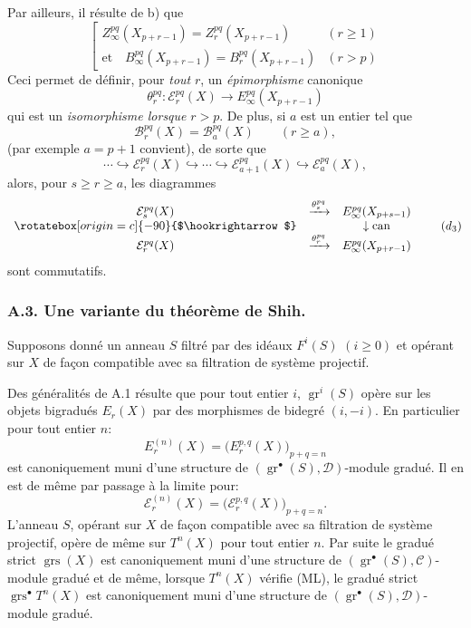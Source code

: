 \documentclass[11pt]{article}
\providecommand{\gr}{\operatorname{gr}}
\providecommand{\gr}{\operatorname{gr}}
\providecommand{\gr}{\operatorname{gr}}
\providecommand{\grs}{\operatorname{grs}}
\providecommand{\can}{\operatorname{can}}
\begin{document}
Par ailleurs, il résulte de b) que
\begin{equation}
\left[
\begin{array}{ll}
Z_\infty^{pq}(X_{p+r-1})=Z_r^{pq}(X_{p+r-1})&(r\ge1)\\[3pt]
\text{et}\quad B_\infty^{pq}(X_{p+r-1})=B_r^{pq}(X_{p+r-1})&(r>p)
\end{array}
\right.
\tag{\(d_2\)}
\end{equation}
Ceci permet de définir, pour \emph{tout} \(r\), un \emph{épimorphisme} canonique
\[
\theta_r^{pq}:\mathcal E_r^{pq}(X)\longrightarrow E_\infty^{pq}(X_{p+r-1})
\]
qui est un \emph{isomorphisme lorsque} \(r>p\). De plus, si \(a\) est un entier tel que
\[
\mathcal B_r^{pq}(X)=\mathcal B_a^{pq}(X)\qquad(r\ge a),
\]
(par exemple \(a=p+1\) convient), de sorte que
\begin{equation}
\cdots\hookrightarrow\mathcal E_r^{pq}(X)\hookrightarrow\cdots\hookrightarrow
\mathcal E_{a+1}^{pq}(X)\hookrightarrow\mathcal E_a^{pq}(X),
\tag{S bis}
\end{equation}
alors, pour \(s\ge r\ge a\), les diagrammes
\begin{equation}
\begin{array}{ccc}
\mathcal E_s^{pq}(X)&\xrightarrow{\theta_s^{pq}}&E_\infty^{pq}(X_{p+s-1})\\
\rotatebox[origin=c]{-90}{$\hookrightarrow$}&&\downarrow\can\\
\mathcal E_r^{pq}(X)&\xrightarrow{\theta_r^{pq}}&E_\infty^{pq}(X_{p+r-1})
\end{array}
\tag{\(d_3\)}
\end{equation}
sont commutatifs.

\subsubsection*{A.3. Une variante du théorème de Shih.}
Supposons donné un anneau \(S\) filtré par des idéaux \(F^i(S)\) \((i\ge0)\) et opérant sur \(X\) de façon compatible avec sa filtration de système projectif.

Des généralités de A.1 résulte que pour tout entier \(i\), \(\gr^i(S)\) opère sur les objets bigradués \(E_r(X)\) par des morphismes de bidegré \((i,-i)\). En particulier pour tout entier \(n\):
\[
E_r^{(n)}(X)=\bigl(E_r^{p,q}(X)\bigr)_{p+q=n}
\]
est canoniquement muni d'une structure de \((\gr^\bullet(S),\mathcal D)\)-module gradué. Il en est de même par passage à la limite pour:
\[
\mathcal E_r^{(n)}(X)=\bigl(\mathcal E_r^{p,q}(X)\bigr)_{p+q=n}.
\]
L'anneau \(S\), opérant sur \(X\) de façon compatible avec sa filtration de système projectif, opère de même sur \(T^n(X)\) pour tout entier \(n\). Par suite le gradué strict \(\grs(X)\) est
canoniquement muni d'une structure de \((\gr^\bullet(S),\mathcal C)\)-module gradué et de même, lorsque \(T^n(X)\) vérifie (ML), le gradué strict \(\grs^\bullet T^n(X)\) est canoniquement muni d'une structure de \((\gr^\bullet(S),\mathcal D)\)-module gradué.
\end{document}
